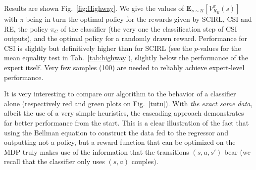 \documentclass[smallextended]{svjour3}
\begin{document}
Results are shown Fig.~\ref{fig:Highway}. We give the values of $\mathbf{E}_{s\sim\mathcal{U}}[V^{\pi}_{R_E}(s)]$ with $\pi$ being in turn the optimal policy for the rewards given by SCIRL, CSI and RE, the policy $\pi_C$ of the classifier (the very one the classification step of CSI outputs), and the optimal policy for a randomly drawn reward. Performance for CSI is slightly but definitively higher than for SCIRL (see the $p$-values for the mean equality test in Tab.~\ref{tab:highway}), slightly below the performance of the expert itself. Very few samples (100) are needed to reliably achieve expert-level performance.

It is very interesting to compare our algorithm to the behavior of a classifier alone (respectively red and green plots on Fig.~\ref{tutu}). With \emph{the exact same data}, albeit the use of a very simple heuristics, the cascading approach demonstrates far better performance from the start. This is a clear illustration of the fact that using the Bellman equation to construct the data fed to the regressor and outputting not a policy, but a reward function that can be optimized on the MDP truly makes use of the information that the transitions $(s,a,s')$ bear (we recall that the classifier only uses $(s,a)$ couples).
\end{document}

